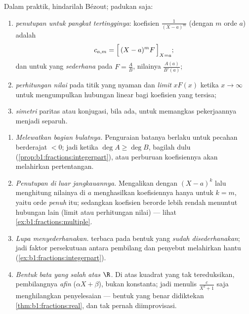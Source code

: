 \begin{method}\label{met:b1:fractions:compute}
Dalam praktik, hindarilah Bézout; padukan saja:
\begin{enumerate}
  \item \emph{penutupan untuk pangkat tertingginya}: koefisien
        $\frac{1}{(X-a)^m}$ (dengan $m$ orde  $a$) adalah
        \[
        c_{a,m} = \Bigl[\,(X - a)^m F\,\Bigr]_{X = a};
        \]
        dan untuk  yang \emph{sederhana} pada $F = \frac AB$, nilainya
        $\frac{A(a)}{B'(a)}$;
  \item \emph{perhitungan nilai} pada titik yang nyaman dan \emph{limit}
        $xF(x)$ ketika $x \to \infty$ untuk mengumpulkan hubungan linear bagi
        koefisien yang tersisa;
  \item \emph{simetri} paritas atau konjugasi, bila ada, untuk memangkas
        pekerjaannya menjadi separuh.
\end{enumerate}
\end{method}

\begin{remark}\label{rem:b1:fractions:pitfalls}
\begin{enumerate}
  \item \emph{Melewatkan bagian bulatnya.} Penguraian batanya
        berlaku untuk pecahan berderajat $< 0$; jadi ketika $\deg A \geq
        \deg B$, bagilah dulu
        (\cref{prop:b1:fractions:integerpart}), atau perburuan
        koefisiennya akan melahirkan pertentangan.
  \item \emph{Penutupan di luar jangkauannya.} Mengalikan dengan
        $(X - a)^k$ lalu menghitung nilainya di $a$ menghasilkan koefisiennya
        hanya untuk $k = m$, yaitu orde \emph{penuh}  itu; sedangkan
        koefisien berorde lebih rendah menuntut hubungan lain (limit atau
        perhitungan nilai) --- lihat \cref{ex:b1:fractions:multiple}.
  \item \emph{Lupa menyederhanakan.}  terbaca pada bentuk yang
        \emph{sudah disederhanakan}; jadi faktor persekutuan antara pembilang
        dan penyebut melahirkan  hantu
        (\cref{ex:b1:fractions:integerpart}).
  \item \emph{Bentuk bata yang salah atas $\R$.} Di atas kuadrat yang
        tak tereduksikan, pembilangnya \emph{afin} ($\alpha X +
        \beta$), bukan konstanta; jadi menulis $\frac{c}{X^2 + 1}$ saja
        menghilangkan penyelesaian --- bentuk yang benar didiktekan
        \cref{thm:b1:fractions:real}, dan tak pernah diimprovisasi.
\end{enumerate}
\end{remark}


